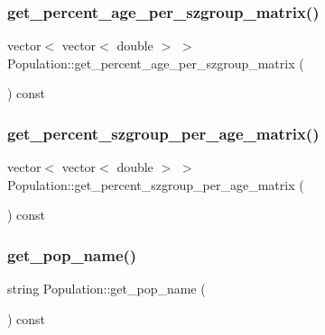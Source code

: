 \subsubsection{\texorpdfstring{get\_percent\_age\_per\_szgroup\_matrix()}{get\_percent\_age\_per\_szgroup\_matrix()}}
{\footnotesize\ttfamily vector$<$ vector$<$ double $>$ $>$ Population\+::get\+\_\+percent\+\_\+age\+\_\+per\+\_\+szgroup\+\_\+matrix (\begin{DoxyParamCaption}{ }\end{DoxyParamCaption}) const}

\mbox{\label{class_population_ae049b91e1359f11caf562a4ccc4dd772}} 
\subsubsection{\texorpdfstring{get\_percent\_szgroup\_per\_age\_matrix()}{get\_percent\_szgroup\_per\_age\_matrix()}}
{\footnotesize\ttfamily vector$<$ vector$<$ double $>$ $>$ Population\+::get\+\_\+percent\+\_\+szgroup\+\_\+per\+\_\+age\+\_\+matrix (\begin{DoxyParamCaption}{ }\end{DoxyParamCaption}) const}

\mbox{\label{class_population_ab297cd923f7361ac308d25467536db77}} 
\subsubsection{\texorpdfstring{get\_pop\_name()}{get\_pop\_name()}}
{\footnotesize\ttfamily string Population\+::get\+\_\+pop\+\_\+name (\begin{DoxyParamCaption}{ }\end{DoxyParamCaption}) const}

\mbox{\label{class_population_aa0aba8f408b3ebdbf48b775efb6f0f8a}} 
